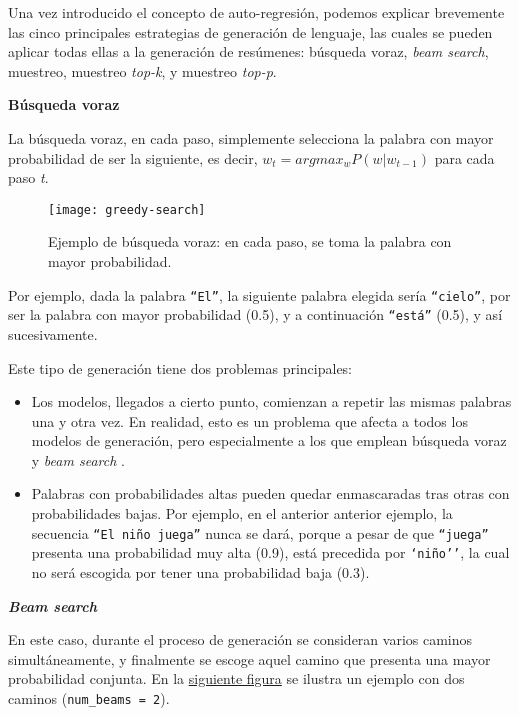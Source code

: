 Una vez introducido el concepto de auto-regresión, podemos explicar brevemente las cinco	 principales estrategias de generación de lenguaje, las cuales se pueden aplicar todas ellas a la generación de resúmenes: búsqueda voraz, \emph{beam search}, muestreo, muestreo \emph{top-k}, y muestreo \emph{top-p}.

\bigskip
\noindent
\textbf{Búsqueda voraz}

La búsqueda voraz, en cada paso, simplemente selecciona la palabra con mayor probabilidad de ser la siguiente, es decir, $ w_t = argmax_w P(w|w_{t-1}) $ para cada paso \emph{t}.

\begin{figure}[h]
	\centering
	\texttt{[image: greedy-search]}
	\caption[Ejemplo de generación con búsqueda voraz.]{Ejemplo de búsqueda voraz: en cada paso, se toma la palabra con mayor probabilidad.}
\end{figure}


Por ejemplo, dada la palabra \texttt{``El''}, la siguiente palabra elegida sería \texttt{``cielo''}, por ser la palabra con mayor probabilidad (0.5), y a continuación \texttt{``está''} (0.5), y así sucesivamente.

Este tipo de generación tiene dos problemas principales:

\begin{itemize}
	\item [\textbullet] Los modelos, llegados a cierto punto, comienzan a repetir las mismas palabras una y otra vez. En realidad, esto es un problema que afecta a todos los modelos de generación, pero especialmente a los que emplean búsqueda voraz y \emph{beam search} \cite{vijayakumar16, shao17}.
	\item [\textbullet] Palabras con probabilidades altas pueden quedar enmascaradas tras otras con probabilidades bajas. Por ejemplo, en el anterior anterior ejemplo, la secuencia \texttt{``El niño juega''} nunca se dará, porque a pesar de que \texttt{``juega''} presenta una probabilidad muy alta (0.9), está precedida por \texttt{`niño''}, la cual no será escogida por tener una probabilidad baja (0.3).
\end{itemize}


\bigskip
\noindent
\textbf{\emph{Beam search}}

En este caso, durante el proceso de generación se consideran varios caminos simultáneamente, y finalmente se escoge aquel camino que presenta una mayor probabilidad conjunta. En la \hyperref[fig:beam-search]{siguiente figura} se ilustra un ejemplo con dos caminos (\texttt{num\_beams = 2}).

